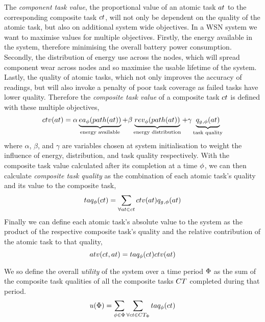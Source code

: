 The \textit{component task value}, the proportional value of an atomic task $\varAtomicTask{}{}$ to the corresponding composite task $\varCompositeTask{}{}$, will not only be dependent on the quality of the atomic task, but also on additional system wide objectives. In a WSN system we want to maximise values for multiple objectives. Firstly, the energy available in the system, therefore minimising the overall battery power consumption. Secondly, the distribution of energy use across the nodes, which will spread component wear across nodes and so maximise the usable lifetime of the system. Lastly, the quality of atomic tasks, which not only improves the accuracy of readings, but will also invoke a penalty of poor task coverage as failed tasks have lower quality. Therefore the \textit{composite task value} of a composite task $\varCompositeTask{}{}$ is defined with these multiple objectives,
\begin{equation}
	\label{eq:ctv}
	\functionCompositeTaskValue{}{} = 
	\alpha\underbrace{\functionEnergyAvailable{\functionTaskArc{}{}}{}}_{\text{energy available}}
	+ \beta\underbrace{\functionEnergyVariability{\functionTaskArc{}{}}{}}_{\text{energy distribution}}
	+ 
	\gamma\underbrace{\functionAtomicTaskQualitySignature{}{}}_{\text{task quality}}
\end{equation}
where $\alpha$, $\beta$, and $\gamma$ are variables chosen at system initialisation to weight the influence of energy, distribution, and task quality respectively. With the composite task value calculated after its completion  at a time $\phi$, we can then calculate \textit{composite task quality} as the combination of each atomic task's quality and its value to the composite task,
\begin{equation}
\functionCompositeTaskQuality{}{} = \sum\limits_{\forall \varAtomicTask{}{} \in \varCompositeTask{}{}}
\functionCompositeTaskValue{}{}\functionAtomicTaskQualitySignature{}{}	
\end{equation}
Finally we can define each atomic task's absolute value to the system as the product of the respective composite task's quality and the relative contribution of the atomic task to that quality,
\begin{equation}
	\functionTaskAbsoluteValue{}{} = 
	\functionCompositeTaskQuality{}{}\functionCompositeTaskValue{}{}
\end{equation}

We so define the overall \textit{ utility} of the system over a time period $\Phi$ as the sum of the composite task qualities of all the composite tasks $\setCompositeTask{}{}$ completed during that period.
	\begin{equation}
		\label{eq:system_utility}
		\functionSystemUtility{}{} = \sum\limits_{\varTime{}{} \in \setTime{}{}}
		\sum\limits_{\forall \varCompositeTask{}{} \in \setCompositeTask{\setTime{}{}}{}}
		\functionCompositeTaskQuality{}{}
	\end{equation}